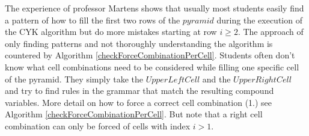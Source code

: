 \noindent The experience of professor Martens shows that usually most students easily find a pattern of how to fill the first two rows of the $pyramid$ during the execution of the CYK algorithm but do more mistakes starting at row $i\geq2$. The approach of only finding patterns and not thoroughly understanding the algorithm is countered by Algorithm \ref{checkForceCombinationPerCell}. Students often don't know what cell combinations need to be considered while filling one specific cell of the pyramid. They simply take the $UpperLeftCell$ and the $UpperRightCell$ and try to find rules in the grammar that match the resulting compound variables. More detail on how to force a correct cell combination (1.) see Algorithm \ref{checkForceCombinationPerCell}. But note that a right cell combination can only be forced of cells with index $i>1$.\\

\noindent 
{}

